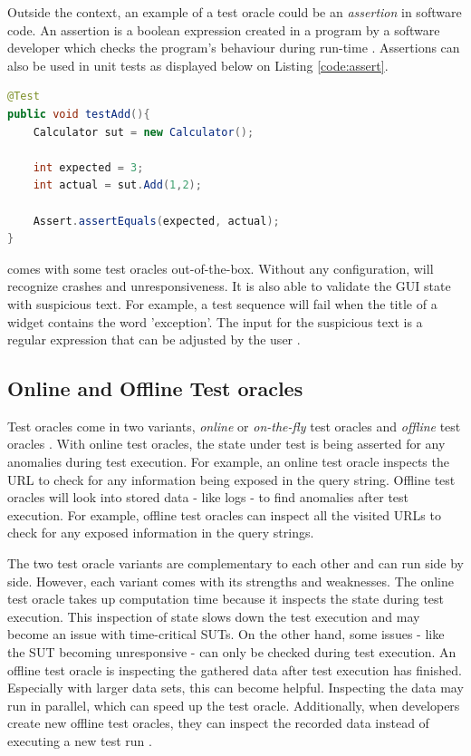 Outside the \testar context, an example of a test oracle could be an \emph{assertion} in software code. An assertion is a boolean expression created in a program by a software developer which checks the program's behaviour during run-time \cite{barr2014oracle}. Assertions can also be used in unit tests as displayed below on Listing \ref{code:assert}. 

\begin{lstlisting}[language=Java, caption=Example assertion, label=code:assert]
@Test
public void testAdd(){
    Calculator sut = new Calculator();

    int expected = 3;
    int actual = sut.Add(1,2);

    Assert.assertEquals(expected, actual);
}
\end{lstlisting}

\testar comes with some test oracles out-of-the-box. Without any configuration, \testar will recognize crashes and unresponsiveness. It is also able to validate the GUI state with suspicious text. For example, a test sequence will fail when the title of a widget contains the word 'exception'. The input for the suspicious text is a regular expression that can be adjusted by the \testar user \cite{VosAho2021}. 

\subsection{Online and Offline Test oracles}
Test oracles come in two variants, \emph{online} or \emph{on-the-fly} test oracles and \emph{offline} test oracles \cite{VosAho2021}. With online test oracles, the state under test is being asserted for any anomalies during test execution. For example,  an online test oracle inspects the URL to check for any information being exposed in the query string. Offline test oracles will look into stored data - like logs - to find anomalies after test execution. For example, offline test oracles can inspect all the visited URLs to check for any exposed information in the query strings.

The two test oracle variants are complementary to each other and can run side by side. However, each variant comes with its strengths and weaknesses. The online test oracle takes up computation time because it inspects the state during test execution. This inspection of state slows down the test execution and may become an issue with time-critical SUTs. On the other hand, some issues - like the SUT becoming unresponsive - can only be checked during test execution. An offline test oracle is inspecting the gathered data after test execution has finished. Especially with larger data sets, this can become helpful. Inspecting the data may run in parallel, which can speed up the test oracle. Additionally, when developers create new offline test oracles, they can inspect the recorded data instead of executing a new test run \cite{de2019offline}.

